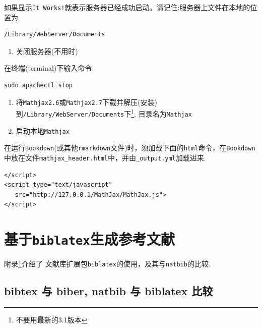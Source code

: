 \documentclass[12pt,]{krantz}
\providecommand{\tightlist}{%
  \setlength{\itemsep}{0pt}\setlength{\parskip}{0pt}}
\theoremstyle{plain}
\theoremstyle{nonumberplain}
\begin{document}
如果显示\texttt{It\ Works!}就表示服务器已经成功启动。请记住:服务器上文件在本地的位置为

\begin{verbatim}
/Library/WebServer/Documents
\end{verbatim}

\begin{enumerate}
\def\labelenumi{\arabic{enumi}.}
\setcounter{enumi}{2}
\tightlist
\item
  关闭服务器(不用时)
\end{enumerate}

在终端(terminal)下输入命令

\begin{verbatim}
sudo apachectl stop
\end{verbatim}

\begin{enumerate}
\def\labelenumi{\arabic{enumi}.}
\setcounter{enumi}{3}
\item
  将\texttt{Mathjax2.6}或\texttt{Mathjax2.7}下载并解压(安装)到\texttt{/Library/WebServer/Documents}下\footnote{不要用最新的3.1版本}, 目录名为\texttt{Mathjax}
\item
  启动本地\texttt{Mathjax}
\end{enumerate}

在运行\texttt{Bookdown}(或其他\texttt{rmarkdown}文件)时，须加载下面的\texttt{html}命令，在\texttt{Bookdown}中放在文件\texttt{mathjax\_header.html}中，并由\texttt{\_output.yml}加载进来.

\begin{verbatim}
</script>
<script type="text/javascript"
   src="http://127.0.0.1/MathJax/MathJax.js">
</script>
\end{verbatim}

\printbibliography[segment=\therefsegment, heading=subbibliography, title={参考文献}]

\hypertarget{biber}{%
\chapter{\texorpdfstring{基于\texttt{biblatex}生成参考文献}{基于biblatex生成参考文献}}\label{biber}}

附录\ref{biber}介绍了 文献库扩展包\texttt{biblatex}的使用，及其与\texttt{natbib}的比较. \autocite{xie2015,R-base}

\hypertarget{sec10-1}{%
\section{bibtex 与 biber, natbib 与 biblatex 比较}\label{sec10-1}}
\end{document}
